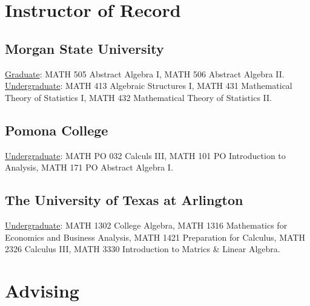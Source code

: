 \documentclass[10pt,a4paper]{article}
\newcommand{\MSU}{Morgan State University}
\newcommand{\UTA}{The University of Texas at Arlington}
\newcommand{\Pomona}{Pomona College}
\begin{document}
\section{Instructor of Record}
\vspace{0.1in}

    \subsection{\MSU}
\href{https://catalog.morgan.edu/preview_program.php?catoid=25\&poid=5681\&hl}{Graduate}: MATH 505 Abstract Algebra I, MATH 506 Abstract Algebra II.\\
\href{https://catalog.morgan.edu/preview_program.php?catoid=24\&poid=5514\&hl}{Undergraduate}: MATH 413 Algebraic Structures I, MATH 431 Mathematical Theory of Statistics I, MATH 432 Mathematical Theory of Statistics II.

    \subsection{\Pomona}
\href{https://catalog.pomona.edu/content.php?filter%5B27%5D=MATH&filter%5B29%5D=&filter%5Bcourse_type%5D=-1&filter%5Bkeyword%5D=&filter%5B32%5D=1&filter%5Bcpage%5D=1&cur_cat_oid=43&expand=&navoid=8669&search_database=Filter&filter%5Bexact_match%5D=1#acalog_template_course_filter}{Undergraduate}: MATH PO 032 Calculs III, MATH 101 PO Introduction to Analysis, MATH 171 PO Abstract Algebra I.%

    \subsection{\UTA}
\href{https://catalog.uta.edu/archives/2019-2020/coursedescriptions/math/}{Undergraduate}: MATH 1302 College Algebra, MATH 1316
Mathematics for Economics and Business Analysis, MATH 1421 Preparation for Calculus, MATH 2326 Calculus III, MATH 3330 Introduction to Matrics \& Linear Algebra.
\section{Advising}
\vspace{0.1in}
\end{document}
